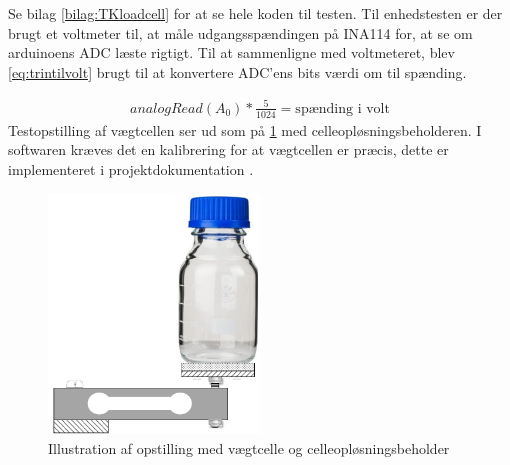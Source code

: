  Se bilag \ref{bilag:TKloadcell} for at se hele koden til testen. Til enhedstesten er der brugt et voltmeter til, at måle udgangsspændingen på INA114 for, at se om arduinoens ADC læste rigtigt. Til at sammenligne med voltmeteret, blev \ref{eq:trintilvolt} brugt til at konvertere ADC'ens bits værdi om til spænding.
 
 \begin{align}
 analogRead(A_0)*\frac{5}{1024}=\text{spænding i volt}
 \label{eq:trintilvolt}
 \end{align}
Testopstilling af vægtcellen ser ud som på \ref{fig:loadcell_mont} med celleopløsningsbeholderen. I softwaren kræves det en kalibrering for at vægtcellen er præcis, dette er implementeret i projektdokumentation .
 
 \begin{figure}[H]
	\centering
	\includegraphics[width=0.5\textwidth]{billeder/Hardware/diagrammer/loadcell_montering.pdf}
	\caption{Illustration af opstilling med vægtcelle og celleopløsningsbeholder}
	\label{fig:loadcell_mont}
\end{figure}

